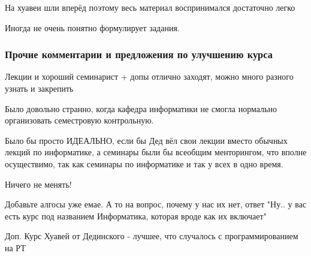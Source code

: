             \begin{commentbox} 
                На хуавеи шли вперёд поэтому весь материал воспринимался достаточно легко  
            \end{commentbox} 
        
            \begin{commentbox} 
                Иногда не очень понятно формулирует задания. 
            \end{commentbox} 

    
    \subsubsection{Прочие комментарии и предложения по улучшению курса}
        \begin{commentbox}
            Лекции и хороший семинарист + допы отлично заходят, можно много разного узнать и закрепить
        \end{commentbox}

        \begin{commentbox}
            Было довольно странно, когда кафедра информатики не смогла нормально организовать семестровую контрольную.
        \end{commentbox}

        \begin{commentbox}
            Было бы просто ИДЕАЛЬНО, если бы Дед вёл свои лекции вместо обычных лекций по информатике, а семинары были бы всеобщим менторингом, что вполне осуществимо, так как семинары по информатике и так у всех в одно время.
        \end{commentbox}

        \begin{commentbox}
            Ничего не менять!
        \end{commentbox}

        \begin{commentbox}
            Добавьте алгосы уже емае. А то на вопрос, почему у нас их нет, ответ "Ну.. у вас есть курс под названием Информатика, которая вроде как их включает"
        \end{commentbox}

        \begin{commentbox}
            Доп. Курс Хуавей от Дединского - лучшее, что случалось с программированием на РТ
        \end{commentbox}